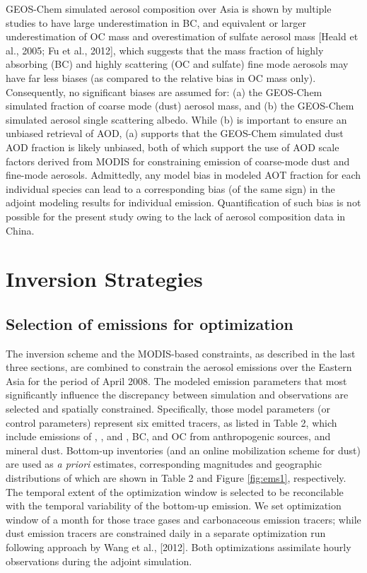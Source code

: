  GEOS-Chem simulated aerosol composition over Asia is shown by multiple studies 
 to have large underestimation in BC, and equivalent or larger underestimation 
 of OC mass and overestimation of sulfate aerosol mass [Heald et al., 2005; Fu et al., 2012], 
 which suggests that the mass fraction of highly absorbing (BC) 
 and highly scattering (OC and sulfate) fine mode aerosols may have far less biases 
 (as compared to the relative bias in OC mass only). 
 Consequently, no significant biases are assumed for: 
 (a) the GEOS-Chem simulated fraction of coarse mode (dust) aerosol mass, 
 and (b) the GEOS-Chem simulated aerosol single scattering albedo. 
 While (b) is important to ensure an unbiased retrieval of AOD, 
 (a) supports that the GEOS-Chem simulated dust AOD fraction is likely unbiased, 
 both of which support the use of AOD scale factors derived from MODIS 
 for constraining emission of coarse-mode dust and fine-mode aerosols. 
 Admittedly, any model bias in modeled AOT fraction for each individual species 
 can lead to a corresponding bias (of the same sign) in the adjoint modeling 
 results for individual emission. 
 Quantification of such bias is not possible for the present study 
 owing to the lack of aerosol composition data in China.

\section{Inversion Strategies}

\subsection{Selection of emissions for optimization} \label{sec:selectems}

 The inversion scheme and the MODIS-based constraints, as described in the last three sections, 
 are combined to constrain the aerosol emissions over the Eastern Asia 
 for the period of April 2008. 
 The modeled emission parameters that most significantly influence the discrepancy 
 between simulation and observations are selected and spatially constrained. 
 Specifically, those model parameters (or control parameters) represent six emitted tracers, 
 as listed in Table 2, which include emissions of , , and , BC, 
 and OC from anthropogenic sources, and mineral dust. 
 Bottom-up inventories (and an online mobilization scheme for dust) are used as 
 \textit{a priori} estimates, corresponding magnitudes and geographic distributions 
 of which are shown in Table 2 and Figure \ref{fig:ems1}, respectively. 
 The temporal extent of the optimization window is selected 
 to be reconcilable with the temporal variability of the bottom-up emission. 
 We set optimization window of a month for those trace gases and carbonaceous emission tracers; 
 while dust emission tracers are constrained daily in a separate optimization run 
 following approach by Wang et al., [2012]. 
 Both optimizations assimilate hourly observations during the adjoint simulation. 

